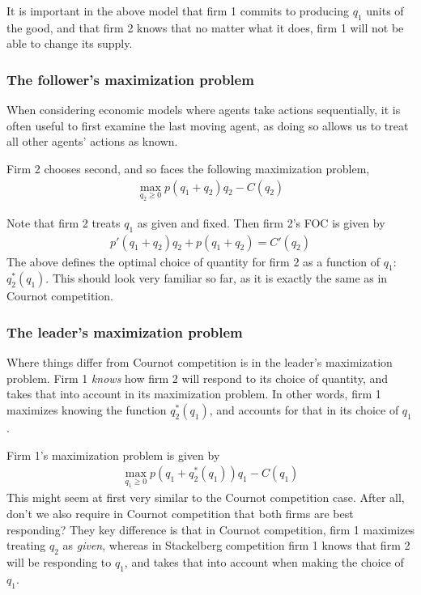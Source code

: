 It is important in the above model that firm 1 commits to producing $q_1$ units of the good, and that firm 2 knows that no matter what it does, firm 1 will not be able to change its supply.

\subsubsection*{The follower's maximization problem}
When considering economic models where agents take actions sequentially, it is often useful to first examine the last moving agent, as doing so allows us to treat all other agents' actions as known.

Firm 2 chooses second, and so faces the following maximization problem,
\begin{align*}
    \max_{q_2 \geq 0}  p(q_1 + q_2) q_2 - C(q_2)
\end{align*}

Note that firm 2 treats $q_1$ as given and fixed. Then firm 2's FOC is given by
\begin{align*}
    p'(q_1 + q_2)q_2 + p(q_1 + q_2) = C'(q_2)
\end{align*}
The above defines the optimal choice of quantity for firm 2 as a function of $q_1$: $q_2^*(q_1)$. This should look very familiar so far, as it is exactly the same as in Cournot competition. 

\subsubsection*{The leader's maximization problem}
Where things differ from Cournot competition is in the leader's maximization problem. Firm 1 \emph{knows} how firm 2 will respond to its choice of quantity, and takes that into account in its maximization problem. In other words, firm 1 maximizes knowing the function $q_2^*(q_1)$, and accounts for that in its choice of $q_1$.

Firm 1's maximization problem is given by
\begin{align*}
    \max_{q_1 \geq 0} p(q_1 + q_2^*(q_1)) q_1 - C(q_1)
\end{align*}
This might seem at first very similar to the Cournot competition case. After all, don't we also require in Cournot competition that both firms are best responding? They key difference is that in Cournot competition, firm 1 maximizes treating $q_2$ as \emph{given}, whereas in Stackelberg competition firm 1 knows that firm 2 will be responding to $q_1$, and takes that into account when making the choice of $q_1$. 

